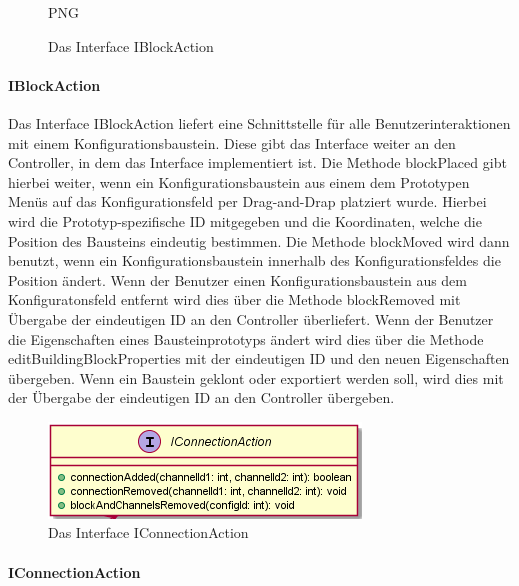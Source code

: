 \documentclass[parskip=full]{scrartcl}
\begin{document}
\begin{figure}[htbp]
	\begin{center}
PNG
		\caption{Das Interface IBlockAction}
		\label{IBlockAction}
	\end{center}
\end{figure}

\paragraph{IBlockAction}

Das Interface IBlockAction liefert eine Schnittstelle für alle Benutzerinteraktionen mit einem Konfigurationsbaustein. Diese gibt das Interface weiter an den Controller, in dem das Interface implementiert ist. Die Methode blockPlaced gibt hierbei weiter, wenn ein Konfigurationsbaustein aus einem dem Prototypen Menüs auf das Konfigurationsfeld per Drag-and-Drap platziert wurde. Hierbei wird die Prototyp-spezifische ID mitgegeben und die Koordinaten, welche die Position des Bausteins eindeutig bestimmen. Die Methode blockMoved wird dann benutzt, wenn ein Konfigurationsbaustein innerhalb des Konfigurationsfeldes die Position ändert. Wenn der Benutzer einen Konfigurationsbaustein aus dem Konfiguratonsfeld entfernt wird dies über die Methode blockRemoved mit Übergabe der eindeutigen ID an den Controller überliefert. Wenn der Benutzer die Eigenschaften eines Bausteinprototyps ändert wird dies über die Methode editBuildingBlockProperties mit der eindeutigen ID und den neuen Eigenschaften übergeben. Wenn ein Baustein geklont oder exportiert werden soll, wird dies mit der Übergabe der eindeutigen ID an den Controller übergeben.

\begin{figure}[htbp]
	\begin{center}
		\includegraphics[width = 9 cm]{Grafiken/View/IConnectionAction.PNG}
		\caption{Das Interface IConnectionAction}
		\label{IConnectionAction}
	\end{center}
\end{figure}

\paragraph{IConnectionAction}
\end{document}
